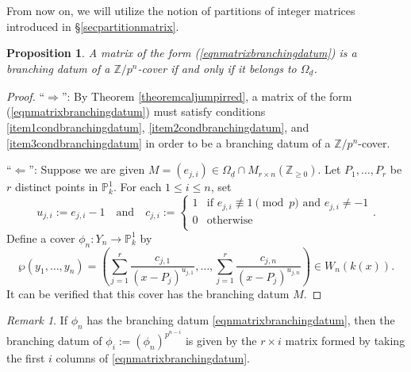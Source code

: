 \documentclass{compositio}
\newtheorem{proposition}[theorem]{Proposition}
\theoremstyle{remark}
\theoremstyle{remark}
\newtheorem{remark}[theorem]{Remark}
\begin{document}
From now on, we will utilize the notion of partitions of integer matrices introduced in \S \ref{secpartitionmatrix}. 

\begin{proposition}
\label{propcorrespondencematrixcover}
A matrix of the form (\ref{eqnmatrixbranchingdatum}) is a branching datum of a $\mathbb{Z}/p^n$-cover if and only if it belongs to $\Omega_{\underline{d}}$.
\end{proposition}

\begin{proof}
    ``$\Rightarrow$'': By Theorem \ref{theoremcaljumpirred}, a matrix of the form (\ref{eqnmatrixbranchingdatum}) must satisfy conditions \ref{item1condbranchingdatum}, \ref{item2condbranchingdatum}, and \ref{item3condbranchingdatum} in order to be a branching datum of a $\mathbb{Z}/p^n$-cover.

    ``$\Leftarrow$'': Suppose we are given $M=(e_{j,i}) \in \Omega_{\underline{d}} \cap M_{r \times n}(\mathbb{Z}_{\ge 0})$. Let $P_1, \ldots, P_r$ be $r$ distinct points in $\mathbb{P}^1_k$. For each $1 \leq i \leq n$, set
\begin{equation*}
    u_{j,i} := e_{j,i}-1 \quad \text{and} \quad c_{j,i}:=\begin{cases}
    1 & \text{if $e_{j,i} \not\equiv 1 \pmod{p}$ and $e_{j,i} \neq -1$}  \\
    0 & \text{otherwise} \\
    \end{cases}.
\end{equation*}
Define a cover $\phi_n: Y_n \xrightarrow{} \mathbb{P}^1_k$ by
\begin{equation*}
    \wp(y_1, \ldots, y_n)=\left( \sum_{j=1}^r  \frac{c_{j,1}}{(x-P_j)^{u_{j,1}}}, \ldots, \sum_{j=1}^r  \frac{c_{j,n}}{(x-P_j)^{u_{j,n}}} \right) \in W_n(k(x)).
\end{equation*}
It can be verified that this cover has the branching datum $M$.
\end{proof}

\begin{remark}
If $\phi_n$ has the branching datum \eqref{eqnmatrixbranchingdatum}, then the branching datum of $\phi_i:=(\phi_n)^{p^{n-i}}$ is given by the $r \times i$ matrix formed by taking the first $i$ columns of \eqref{eqnmatrixbranchingdatum}.
\end{remark}
\end{document}

